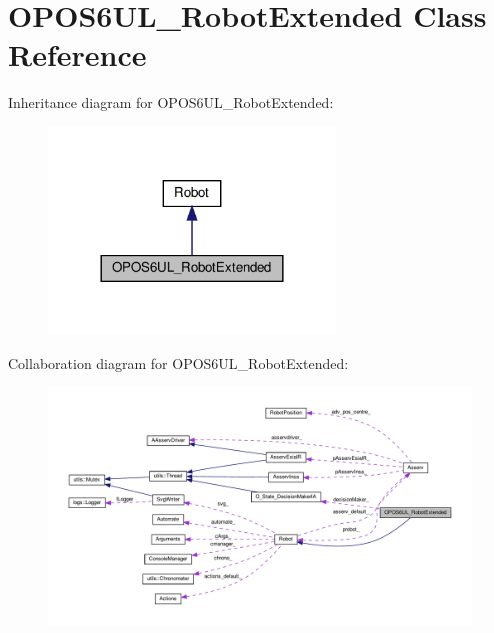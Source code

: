 \hypertarget{classOPOS6UL__RobotExtended}{}\section{O\+P\+O\+S6\+U\+L\+\_\+\+Robot\+Extended Class Reference}
\label{classOPOS6UL__RobotExtended}


Inheritance diagram for O\+P\+O\+S6\+U\+L\+\_\+\+Robot\+Extended\+:
\nopagebreak
\begin{figure}[H]
\begin{center}
\leavevmode
\includegraphics[width=216pt]{classOPOS6UL__RobotExtended__inherit__graph}
\end{center}
\end{figure}


Collaboration diagram for O\+P\+O\+S6\+U\+L\+\_\+\+Robot\+Extended\+:
\nopagebreak
\begin{figure}[H]
\begin{center}
\leavevmode
\includegraphics[width=350pt]{classOPOS6UL__RobotExtended__coll__graph}
\end{center}
\end{figure}
